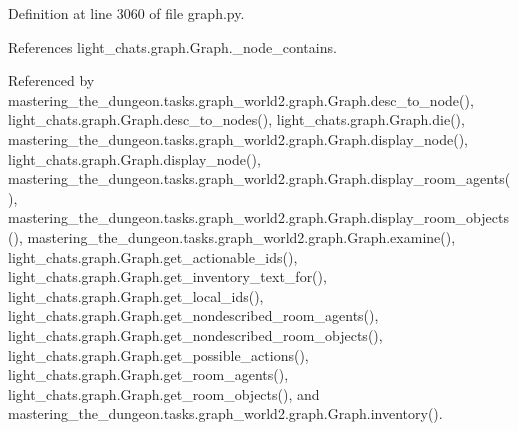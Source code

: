 Definition at line 3060 of file graph.\+py.



References light\+\_\+chats.\+graph.\+Graph.\+\_\+node\+\_\+contains.



Referenced by mastering\+\_\+the\+\_\+dungeon.\+tasks.\+graph\+\_\+world2.\+graph.\+Graph.\+desc\+\_\+to\+\_\+node(), light\+\_\+chats.\+graph.\+Graph.\+desc\+\_\+to\+\_\+nodes(), light\+\_\+chats.\+graph.\+Graph.\+die(), mastering\+\_\+the\+\_\+dungeon.\+tasks.\+graph\+\_\+world2.\+graph.\+Graph.\+display\+\_\+node(), light\+\_\+chats.\+graph.\+Graph.\+display\+\_\+node(), mastering\+\_\+the\+\_\+dungeon.\+tasks.\+graph\+\_\+world2.\+graph.\+Graph.\+display\+\_\+room\+\_\+agents(), mastering\+\_\+the\+\_\+dungeon.\+tasks.\+graph\+\_\+world2.\+graph.\+Graph.\+display\+\_\+room\+\_\+objects(), mastering\+\_\+the\+\_\+dungeon.\+tasks.\+graph\+\_\+world2.\+graph.\+Graph.\+examine(), light\+\_\+chats.\+graph.\+Graph.\+get\+\_\+actionable\+\_\+ids(), light\+\_\+chats.\+graph.\+Graph.\+get\+\_\+inventory\+\_\+text\+\_\+for(), light\+\_\+chats.\+graph.\+Graph.\+get\+\_\+local\+\_\+ids(), light\+\_\+chats.\+graph.\+Graph.\+get\+\_\+nondescribed\+\_\+room\+\_\+agents(), light\+\_\+chats.\+graph.\+Graph.\+get\+\_\+nondescribed\+\_\+room\+\_\+objects(), light\+\_\+chats.\+graph.\+Graph.\+get\+\_\+possible\+\_\+actions(), light\+\_\+chats.\+graph.\+Graph.\+get\+\_\+room\+\_\+agents(), light\+\_\+chats.\+graph.\+Graph.\+get\+\_\+room\+\_\+objects(), and mastering\+\_\+the\+\_\+dungeon.\+tasks.\+graph\+\_\+world2.\+graph.\+Graph.\+inventory().

